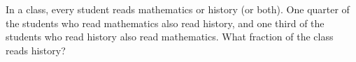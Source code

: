 In a class, every student reads mathematics or history (or both). One quarter of the students who read mathematics also read history, and one third of the students who read history also read mathematics. What fraction of the class reads history?
